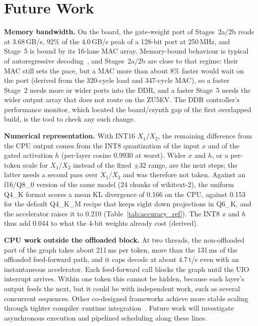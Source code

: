 \section{Future Work}
\label{sec:future}

\textbf{Memory bandwidth.} On the board, the gate-weight port of Stages~2a/2b reads at
3.68\,GB/s, 92\% of the 4.0\,GB/s peak of a 128-bit port at 250\,MHz, and Stage~5 is
bound by its 16-lane MAC array. Memory-bound behaviour is typical of autoregressive
decoding~\cite{FlightLLM}, and Stages~2a/2b are close to that regime: their MAC still
sets the pace, but a MAC more than about 8\% faster would wait on the port (derived from
the 320-cycle load and 347-cycle MAC), so a faster Stage~2 needs more or wider ports into
the DDR, and a faster Stage~5 needs the wider output array that
does not route on the ZU5EV. The DDR controller's performance monitor, which located the
board/csynth gap of the first overlapped build, is the tool to check any such change.

\textbf{Numerical representation.} With INT16 $X_1$/$X_2$, the remaining difference from
the CPU output comes from the INT8 quantization of the input $x$ and of the gated
activation $h$ (per-layer cosine 0.9930 at worst). Wider $x$ and $h$, or a per-token
scale for $X_1$/$X_2$ instead of the fixed $\pm 32$ range, are the next steps; the
latter needs a second pass over $X_1$/$X_2$ and was therefore not taken. Against an
f16/Q8\_0 version of the same model (24 chunks of wikitext-2), the uniform Q4\_K format
scores a mean KL divergence of 0.166 on the CPU, against 0.153 for the default Q4\_K\_M
recipe that keeps eight down projections in Q6\_K, and the accelerator raises it to 0.210
(Table~\ref{tab:accuracy_ref}). The INT8 $x$ and $h$ thus add 0.044 to what the 4-bit
weights already cost (derived).

\textbf{CPU work outside the offloaded block.} At two threads, the non-offloaded part of
the graph takes about 211\,ms per token, more than the 131\,ms of the offloaded
feed-forward path, and it caps decode at about 4.7\,t/s even with an instantaneous
accelerator. Each feed-forward call blocks the graph until the UIO interrupt arrives.
Within one token this cannot be hidden, because each layer's output feeds the next, but
it could be with independent work, such as several concurrent sequences. Other
co-designed frameworks achieve more stable scaling through tighter compiler--runtime
integration~\cite{cano}. Future work will investigate asynchronous execution and
pipelined scheduling along these lines.

